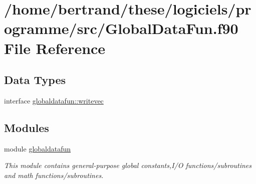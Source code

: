 \hypertarget{_global_data_fun_8f90}{}\section{/home/bertrand/these/logiciels/programme/src/\+Global\+Data\+Fun.f90 File Reference}
\label{_global_data_fun_8f90}
\subsection*{Data Types}
\begin{DoxyCompactItemize}
\item 
interface \hyperlink{interfaceglobaldatafun_1_1writevec}{globaldatafun\+::writevec}
\end{DoxyCompactItemize}
\subsection*{Modules}
\begin{DoxyCompactItemize}
\item 
module \hyperlink{namespaceglobaldatafun}{globaldatafun}
\begin{DoxyCompactList}\small\item\em This module contains general-\/purpose global constants,I/O functions/subroutines and math functions/subroutines. \end{DoxyCompactList}\end{DoxyCompactItemize}
